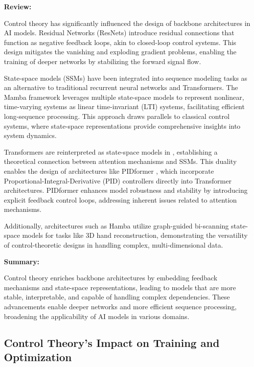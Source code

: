 \documentclass{article}
\theoremstyle{plain}
\theoremstyle{definition}
\theoremstyle{remark}
\begin{document}
\textbf{Review:}

Control theory has significantly influenced the design of backbone architectures in AI models. Residual Networks (ResNets) \cite{heDeepResidualLearning2015} introduce residual connections that function as negative feedback loops, akin to closed-loop control systems. This design mitigates the vanishing and exploding gradient problems, enabling the training of deeper networks by stabilizing the forward signal flow.

State-space models (SSMs) have been integrated into sequence modeling tasks as an alternative to traditional recurrent neural networks and Transformers. The Mamba framework \cite{guMambaLineartimeSequence} leverages multiple state-space models to represent nonlinear, time-varying systems as linear time-invariant (LTI) systems, facilitating efficient long-sequence processing. This approach draws parallels to classical control systems, where state-space representations provide comprehensive insights into system dynamics.

Transformers are reinterpreted as state-space models in \cite{daoTransformersAreSSMs2024}, establishing a theoretical connection between attention mechanisms and SSMs. This duality enables the design of architectures like PIDformer \cite{nguyenPIDformerTransformerMeets2024}, which incorporate Proportional-Integral-Derivative (PID) controllers directly into Transformer architectures. PIDformer enhances model robustness and stability by introducing explicit feedback control loops, addressing inherent issues related to attention mechanisms.

Additionally, architectures such as Hamba \cite{dongHambaSingleview3D2024} utilize graph-guided bi-scanning state-space models for tasks like 3D hand reconstruction, demonstrating the versatility of control-theoretic designs in handling complex, multi-dimensional data.

\textbf{Summary:}

Control theory enriches backbone architectures by embedding feedback mechanisms and state-space representations, leading to models that are more stable, interpretable, and capable of handling complex dependencies. These advancements enable deeper networks and more efficient sequence processing, broadening the applicability of AI models in various domains.

\subsection{Control Theory's Impact on Training and Optimization}
\end{document}
